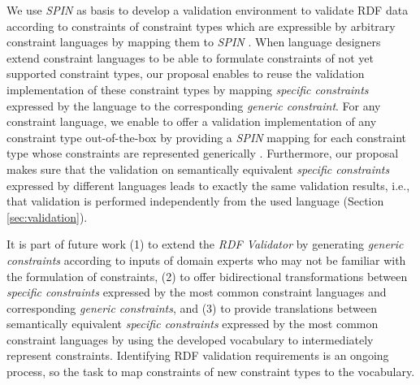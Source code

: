 \documentclass[a4paper,fontsize=11pt]{scrartcl}
\begin{document}
We use \emph{SPIN} as basis to develop a validation environment to validate RDF data according to constraints of constraint types which are expressible by arbitrary constraint languages by mapping them to \emph{SPIN} \cite{BoschEckert2014-2}.
When language designers extend constraint languages 
to be able to formulate constraints of not yet supported constraint types,
our proposal enables to reuse the validation implementation of these constraint types 
by mapping \emph{specific constraints} expressed by the language to the corresponding \emph{generic constraint}.
For any constraint language, we enable to offer a validation implementation of any constraint type out-of-the-box
by providing a \emph{SPIN} mapping
for each constraint type  
whose constraints are represented generically \cite{BoschEckert2015-2}. 
Furthermore, our proposal makes sure that the validation on semantically equivalent \emph{specific constraints} expressed by different languages
leads to exactly the same validation results, 
i.e., that validation is performed independently from the used language (Section \ref{sec:validation}).

It is part of future work 
(1) to extend the \emph{RDF Validator} by generating \emph{generic constraints} according to inputs of domain experts who may not be familiar with the formulation of constraints,
(2) to offer bidirectional transformations between \emph{specific constraints} expressed by the most common constraint languages and corresponding \emph{generic constraints}, and
(3) to provide translations between semantically equivalent \emph{specific constraints} expressed by the most common constraint languages by using the developed vocabulary to intermediately represent constraints.
Identifying RDF validation requirements is an ongoing process,
so the task to map constraints of new constraint types to the vocabulary.


{}

\setcounter{tocdepth}{1}
\end{document}
